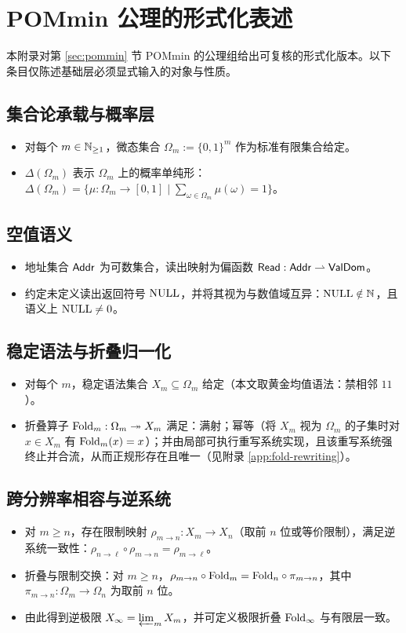 \section{POMmin 公理的形式化表述}\label{app:pommin-formal}

本附录对第 \ref{sec:pommin} 节 POMmin 的公理组给出可复核的形式化版本。以下条目仅陈述基础层必须显式输入的对象与性质。

\subsection{集合论承载与概率层}
\begin{itemize}
  \item 对每个 $m\in\mathbb{N}_{\ge 1}$，微态集合 $\Omega_m:=\{0,1\}^m$ 作为标准有限集合给定。
  \item $\Delta(\Omega_m)$ 表示 $\Omega_m$ 上的概率单纯形：$\Delta(\Omega_m)=\{\mu:\Omega_m\to[0,1]\mid \sum_{\omega\in\Omega_m}\mu(\omega)=1\}$。
\end{itemize}

\subsection{空值语义}
\begin{itemize}
  \item 地址集合 $\mathsf{Addr}$ 为可数集合，读出映射为偏函数 $\mathsf{Read}:\mathsf{Addr}\rightharpoonup \mathsf{ValDom}$。
  \item 约定未定义读出返回符号 $\mathrm{NULL}$，并将其视为与数值域互异：$\mathrm{NULL}\notin\mathbb{N}$，且语义上 $\mathrm{NULL}\neq 0$。
\end{itemize}

\subsection{稳定语法与折叠归一化}
\begin{itemize}
  \item 对每个 $m$，稳定语法集合 $X_m\subseteq\Omega_m$ 给定（本文取黄金均值语法：禁相邻 $11$）。
  \item 折叠算子 $\mathrm{Fold}_m:\Omega_m\twoheadrightarrow X_m$ 满足：满射；幂等（将 $X_m$ 视为 $\Omega_m$ 的子集时对 $x\in X_m$ 有 $\mathrm{Fold}_m(x)=x$）；并由局部可执行重写系统实现，且该重写系统强终止并合流，从而正规形存在且唯一（见附录 \ref{app:fold-rewriting}）。
\end{itemize}

\subsection{跨分辨率相容与逆系统}
\begin{itemize}
  \item 对 $m\ge n$，存在限制映射 $\rho_{m\to n}:X_m\to X_n$（取前 $n$ 位或等价限制），满足逆系统一致性：$\rho_{n\to \ell}\circ\rho_{m\to n}=\rho_{m\to \ell}$。
  \item 折叠与限制交换：对 $m\ge n$，$\rho_{m\to n}\circ \mathrm{Fold}_m = \mathrm{Fold}_n\circ \pi_{m\to n}$，其中 $\pi_{m\to n}:\Omega_m\to\Omega_n$ 为取前 $n$ 位。
  \item 由此得到逆极限 $X_\infty=\varprojlim_m X_m$，并可定义极限折叠 $\mathrm{Fold}_\infty$ 与有限层一致。
\end{itemize}

